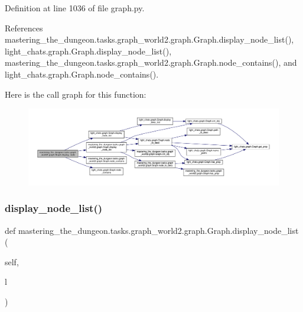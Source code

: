 Definition at line 1036 of file graph.\+py.



References mastering\+\_\+the\+\_\+dungeon.\+tasks.\+graph\+\_\+world2.\+graph.\+Graph.\+display\+\_\+node\+\_\+list(), light\+\_\+chats.\+graph.\+Graph.\+display\+\_\+node\+\_\+list(), mastering\+\_\+the\+\_\+dungeon.\+tasks.\+graph\+\_\+world2.\+graph.\+Graph.\+node\+\_\+contains(), and light\+\_\+chats.\+graph.\+Graph.\+node\+\_\+contains().

Here is the call graph for this function\+:
\nopagebreak
\begin{figure}[H]
\begin{center}
\leavevmode
\includegraphics[width=350pt]{classmastering__the__dungeon_1_1tasks_1_1graph__world2_1_1graph_1_1Graph_a2c19742101a04eeb5850543393e553e6_cgraph}
\end{center}
\end{figure}
\mbox{\label{classmastering__the__dungeon_1_1tasks_1_1graph__world2_1_1graph_1_1Graph_aec236f9614180209537d7ce1c1145649}} 
\subsubsection{\texorpdfstring{display\+\_\+node\+\_\+list()}{display\_node\_list()}}
{\footnotesize\ttfamily def mastering\+\_\+the\+\_\+dungeon.\+tasks.\+graph\+\_\+world2.\+graph.\+Graph.\+display\+\_\+node\+\_\+list (\begin{DoxyParamCaption}\item[{}]{self,  }\item[{}]{l }\end{DoxyParamCaption})}



